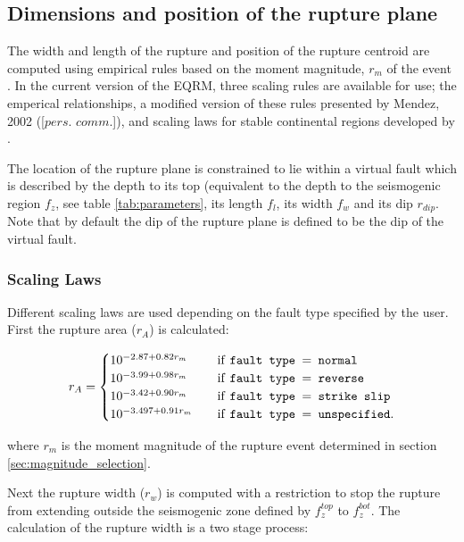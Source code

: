 \subsection{Dimensions and position of the rupture plane}
\label{sec:dim-rupture}

The width and length of the rupture and position of the rupture
centroid are computed using empirical
rules based on the moment magnitude, $r_m$ of the event . In the current version of the EQRM, three scaling 
rules are available for use; the \citet{eqrm_Wells94} emperical relationships, a modified version
of these rules presented by Mendez, 2002 ([$\textit{pers. comm.}$]), and scaling laws for stable continental regions developed 
by \citet{eqrm_Leonard10}.

The location of the rupture plane
is constrained to lie within a virtual fault
which is described by the depth to its top (equivalent to the
depth to the seismogenic region $f_z$, see
table \ref{tab:parameters}, its length $f_l$, its width
$f_w$ and its dip $r_{dip}$. Note that by default the dip of the
 rupture plane is defined to be the dip of the virtual fault. 

\subsubsection{\citep{eqrm_Wells94} Scaling Laws}

Different scaling laws are used depending on the fault type specified by the user. First the rupture area ($r_A$) is calculated:

\begin{equation} \label{ra}
r_A = 
\begin{cases}
10^{-2.87 + 0.82r_m}	& \quad \mbox{if \texttt{fault type $=$  normal}} \\
10^{-3.99 + 0.98r_m}	& \quad \mbox{if \texttt{fault type $=$  reverse}} \\
10^{-3.42 + 0.90r_m}	& \quad \mbox{if \texttt{fault type $=$  strike slip}} \\
10^{-3.497 + 0.91r_m}	& \quad \mbox{if \texttt{fault type $=$  unspecified}} . \\
\end{cases}
\end{equation}

where $r_m$ is the moment magnitude of the rupture event determined in section \ref{sec:magnitude_selection}. 

Next the rupture width ($r_w$) is computed with a restriction to stop the rupture from extending 
outside the seismogenic zone defined by $f_z^{top}$ to $f_z^{bot}$. The calculation of the rupture width is a two stage process:


